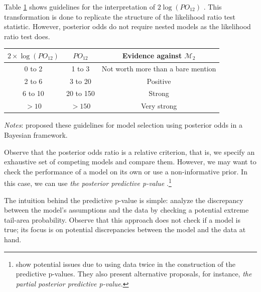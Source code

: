 Table \ref{tab:guide} shows guidelines for the interpretation of \( 2\log(PO_{12}) \) \cite{Kass1995}. This transformation is done to replicate the structure of the likelihood ratio test statistic. However, posterior odds do not require nested models as the likelihood ratio test does.

\begin{table}%
	\label{tab:guide}%
	\begin{tabular}{ccc}
		\textbf{$2\times\log(PO_{12})$}    & \textbf{$PO_{12}$} & \textbf{Evidence against $\mathcal{M}_2$} \\
		\hline
		0 to 2 & 1 to 3 & Not worth more than a bare mention\\
		2 to 6 & 3 to 20 & Positive\\
		6 to 10 & 20 to 150 & Strong\\
		$> 10$  & $> 150$ & Very strong\\
	\end{tabular}
				\begin{tablenotes}
	\footnotesize \textit{Notes}: \cite{Kass1995} proposed these guidelines for model selection using posterior odds in a Bayesian framework.\\
\end{tablenotes}
\end{table}
Observe that the posterior odds ratio is a relative criterion, that is, we specify an exhaustive set of competing models and compare them. However, we may want to check the performance of a model on its own or use a non-informative prior. In this case, we can use \textit{the posterior predictive p-value} \cite{Gelman1996,gelman1996posterior}.\footnote{\cite{Bayarri2000} show potential issues due to using data twice in the construction of the predictive p-values. They also present alternative proposals, for instance, \textit{the partial posterior predictive p-value}.}

The intuition behind the predictive p-value is simple: analyze the discrepancy between the model's assumptions and the data by checking a potential extreme tail-area probability. Observe that this approach does not check if a model is true; its focus is on potential discrepancies between the model and the data at hand.

